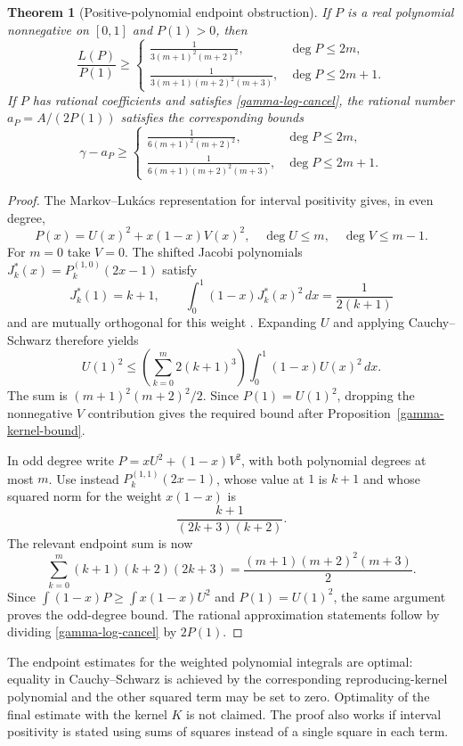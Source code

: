 \documentclass[11pt,a4paper]{article}
\newtheorem{theorem}{Theorem}[section]
\theoremstyle{definition}
\theoremstyle{remark}
\numberwithin{equation}{section}
\begin{document}
\begin{theorem}[Positive-polynomial endpoint obstruction]
\label{gamma-degree-bound}
If $P$ is a real polynomial nonnegative on $[0,1]$ and $P(1)>0$, then
\[
 \frac{L(P)}{P(1)}\ge
 \begin{cases}
 \displaystyle\frac1{3(m+1)^2(m+2)^2},&\deg P\le2m,\\[5pt]
 \displaystyle\frac1{3(m+1)(m+2)^2(m+3)},&\deg P\le2m+1.
 \end{cases}
\]
If $P$ has rational coefficients and satisfies
\eqref{gamma-log-cancel}, the rational number $a_P=A/(2P(1))$
satisfies the corresponding bounds
\[
 \gamma-a_P\ge
 \begin{cases}
 \displaystyle\frac1{6(m+1)^2(m+2)^2},&\deg P\le2m,\\[5pt]
 \displaystyle\frac1{6(m+1)(m+2)^2(m+3)},&\deg P\le2m+1.
 \end{cases}
\]
\end{theorem}
\begin{proof}
The Markov--Luk\'acs representation for interval positivity
\cite{gamma-Schmudgen} gives, in even degree,
\[
 P(x)=U(x)^2+x(1-x)V(x)^2,
 \quad \deg U\le m,\quad\deg V\le m-1.
\]
For $m=0$ take $V=0$. The shifted Jacobi polynomials
$J_k^{*}(x)=P_k^{(1,0)}(2x-1)$ satisfy
\[
 J_k^{*}(1)=k+1,\qquad
 \int_0^1(1-x)J_k^{*}(x)^2\,dx=\frac1{2(k+1)}
\]
and are mutually orthogonal for this weight \cite{gamma-DLMF}.
Expanding $U$ and applying Cauchy--Schwarz therefore yields
\[
 U(1)^2\le
 \left(\sum_{k=0}^m2(k+1)^3\right)
 \int_0^1(1-x)U(x)^2\,dx.
\]
The sum is $(m+1)^2(m+2)^2/2$. Since $P(1)=U(1)^2$, dropping the
nonnegative $V$ contribution gives the required bound after
Proposition~\ref{gamma-kernel-bound}.

In odd degree write
$P=xU^2+(1-x)V^2$, with both polynomial degrees at most $m$.
Use instead $P_k^{(1,1)}(2x-1)$, whose value at $1$ is $k+1$ and
whose squared norm for the weight $x(1-x)$ is
\[
 \frac{k+1}{(2k+3)(k+2)}.
\]
The relevant endpoint sum is now
\[
 \sum_{k=0}^m(k+1)(k+2)(2k+3)
 =\frac{(m+1)(m+2)^2(m+3)}2.
\]
Since $\int(1-x)P\ge\int x(1-x)U^2$ and $P(1)=U(1)^2$, the same
argument proves the odd-degree bound. The rational approximation
statements follow by dividing \eqref{gamma-log-cancel} by $2P(1)$.
\end{proof}

The endpoint estimates for the weighted polynomial integrals are
optimal: equality in Cauchy--Schwarz is achieved by the corresponding
reproducing-kernel polynomial and the other squared term may be set
to zero. Optimality of the final estimate with the kernel $K$ is not
claimed. The proof also works if interval positivity is stated using
sums of squares instead of a single square in each term.
\end{document}
